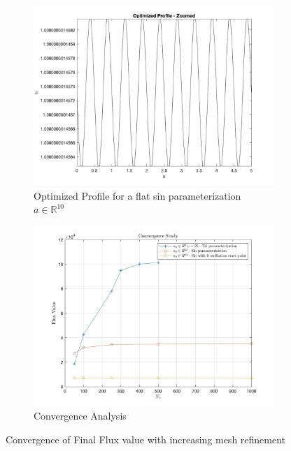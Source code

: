 \documentclass{article}
\begin{document}
\begin{figure}[h]
\begin{subfigure}[b]{0.45\textwidth}
\centering
\includegraphics[width = \textwidth]{opt_zoomed_pt2}
\caption{Optimized Profile for a flat sin parameterization $a \in \mathbb{R}^{10}$}
\label{fig: 10 dim sin}
\end{subfigure}
\hfill
\begin{subfigure}[b]{0.45\textwidth}
\centering
\includegraphics[width = \textwidth]{Convergence_study_2}
\caption{Convergence Analysis}
\label{fig: convergence analysis} 
\end{subfigure}
\caption{Convergence of Final Flux value with increasing mesh refinement}
\end{figure}
\end{document}
